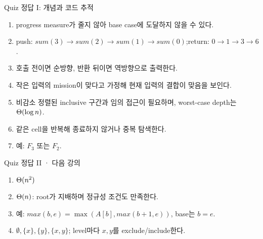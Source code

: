 \begin{frame}{Quiz 정답 I: 개념과 코드 추적}\small
\begin{enumerate}
  \item progress measure가 줄지 않아 base case에 도달하지 않을 수 있다.
  \item push: $sum(3)\to sum(2)\to sum(1)\to sum(0)$;\quad return: $0\to1\to3\to6$.
  \item 호출 전이면 순방향, 반환 뒤이면 역방향으로 출력한다.
  \item 작은 입력의 mission이 맞다고 가정해 현재 입력의 결합이 맞음을 보인다.
  \item 비감소 정렬된 inclusive 구간과 임의 접근이 필요하며, worst-case depth는 $\Theta(\log n)$.
  \item 같은 cell을 반복해 종료하지 않거나 중복 탐색한다.
  \item 예: $F_3$ 또는 $F_2$.
\end{enumerate}
\end{frame}
\begin{frame}{Quiz 정답 II · 다음 강의}\small
\begin{enumerate}
  \item $\Theta(n^2)$
  \item $\Theta(n)$: root가 지배하며 정규성 조건도 만족한다.
  \item 예: $max(b,e)=\max(A[b],max(b+1,e))$, base는 $b=e$.
  \item $\emptyset,\{x\},\{y\},\{x,y\}$; level마다 $x,y$를 exclude/include한다.
\end{enumerate}
\end{frame}
